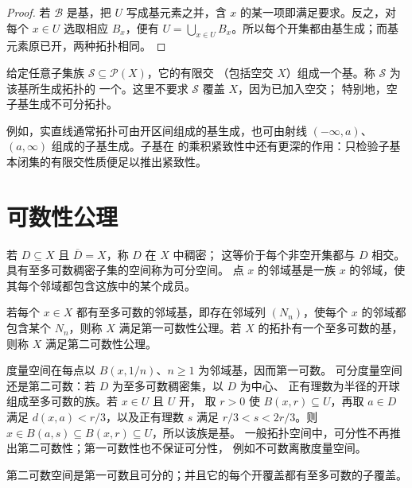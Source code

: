 \begin{proof}
若 \(\mathcal B\) 是基，把 \(U\) 写成基元素之并，含 \(x\) 的某一项即满足要求。反之，对每个 \(x\in U\) 选取相应 \(B_x\)，便有 \(U=\bigcup_{x\in U}B_x\)。所以每个开集都由基生成；而基元素原已开，两种拓扑相同。
\end{proof}

\begin{definition}[子基]
给定任意子集族 \(\mathcal S\subseteq\mathcal P(X)\)，它的有限交
（包括空交 \(X\)）组成一个基。称 \(\mathcal S\) 为该基所生成拓扑的
一个。这里不要求 \(\mathcal S\) 覆盖 \(X\)，因为已加入空交；
特别地，空子基生成不可分拓扑。
\end{definition}

例如，实直线通常拓扑可由开区间组成的基生成，也可由射线
\((-\infty,a)\)、\((a,\infty)\) 组成的子基生成。子基在
的乘积紧致性中还有更深的作用：只检验子基本闭集的有限交性质便足以推出紧致性。

\section{可数性公理}

若 \(D\subseteq X\) 且 \(\overline D=X\)，称 \(D\) 在 \(X\) 中稠密；
这等价于每个非空开集都与 \(D\) 相交。具有至多可数稠密子集的空间称为可分空间。
点 \(x\) 的邻域基是一族 \(x\) 的邻域，使其每个邻域都包含这族中的某个成员。

\begin{definition}[第一、第二可数性]
若每个 \(x\in X\) 都有至多可数的邻域基，即存在邻域列 \((N_n)\)，使每个 \(x\) 的邻域都包含某个 \(N_n\)，则称 \(X\) 满足第一可数性公理。若 \(X\) 的拓扑有一个至多可数的基，则称 \(X\) 满足第二可数性公理。
\end{definition}

度量空间在每点以 \(B(x,1/n)\)、\(n\ge1\) 为邻域基，因而第一可数。
可分度量空间还是第二可数：若 \(D\) 为至多可数稠密集，以 \(D\) 为中心、
正有理数为半径的开球组成至多可数的族。若 \(x\in U\) 且 \(U\) 开，
取 \(r>0\) 使 \(B(x,r)\subseteq U\)，再取 \(a\in D\) 满足
\(d(x,a)<r/3\)，以及正有理数 \(s\) 满足 \(r/3<s<2r/3\)。则
\(x\in B(a,s)\subseteq B(x,r)\subseteq U\)，所以该族是基。
一般拓扑空间中，可分性不再推出第二可数性；第一可数性也不保证可分性，
例如不可数离散度量空间。

\begin{proposition}[第二可数性的两个后果]
\label{prop:second-countable-consequences}
第二可数空间是第一可数且可分的；并且它的每个开覆盖都有至多可数的子覆盖。
\end{proposition}

